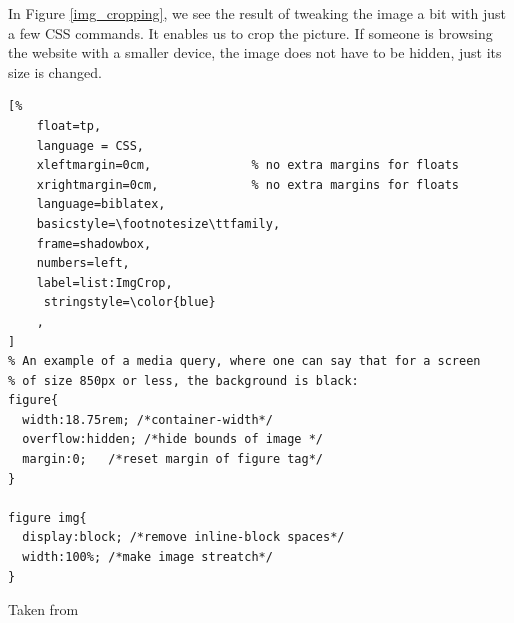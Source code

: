 In Figure \ref{img_cropping}, we see the result of
tweaking the image a bit with just a few CSS commands. It enables us 
to crop the picture. If someone is browsing the website with a
smaller device, the image does not have to be hidden, just its size is
changed.

\begin{lstlisting}[%
    float=tp,
    language = CSS, 
    xleftmargin=0cm,              % no extra margins for floats
    xrightmargin=0cm,             % no extra margins for floats
    language=biblatex,
    basicstyle=\footnotesize\ttfamily,
    frame=shadowbox,
    numbers=left,
    label=list:ImgCrop,
     stringstyle=\color{blue}
    ,
]
% An example of a media query, where one can say that for a screen 
% of size 850px or less, the background is black:
figure{
  width:18.75rem; /*container-width*/
  overflow:hidden; /*hide bounds of image */
  margin:0;   /*reset margin of figure tag*/
}

figure img{
  display:block; /*remove inline-block spaces*/
  width:100%; /*make image streatch*/
}
\end{lstlisting}
Taken from
